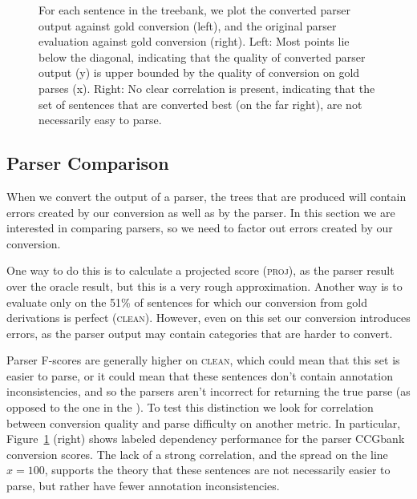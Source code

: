 \begin{figure}
	\vspace{-0.3cm}
	\hspace{-1.4cm}
	\scalebox{0.8}{
	
	\hspace{-2.9cm}
	
	}
	\vspace{-0.8cm}
	\caption{
		\label{fig:scatter_plots}
		For each sentence in the treebank, we plot the converted parser output
		against gold conversion (left), and the original parser evaluation against
		gold conversion (right).
		Left: Most points lie below the diagonal, indicating that the quality of
		converted parser output (y) is upper bounded by the quality of conversion on
		gold parses (x).
		Right: No clear correlation is present, indicating that the set of
		sentences that are converted best (on the far right), are not necessarily
		easy to parse.
	\vspace{-4.5mm}
	}
\end{figure}

\subsection{Parser Comparison}

When we convert the output of a \ccg parser, the \ptb trees that are produced
will contain errors created by our conversion as well as by the parser. In this
section we are interested in comparing parsers, so we need to factor out errors
created by our conversion.

One way to do this is to calculate a projected score (\textsc{proj}), as the
parser result over the oracle result, but this is a very rough approximation.
Another way is to evaluate only on the 51\% of sentences for which our
conversion from gold \ccg derivations is perfect (\textsc{clean}).  However,
even on this set our conversion introduces errors, as the parser output may
contain categories that are harder to convert.

Parser F-scores are generally higher on \textsc{clean}, which could mean that this
set is easier to parse, or it could mean that these sentences don't contain
annotation inconsistencies, and so the parsers aren't incorrect for returning
the true parse (as opposed to the one in the \ptb).  To test this distinction
we look for correlation between conversion quality and parse difficulty on
another metric.  In particular, Figure~\ref{fig:scatter_plots} (right) shows
\ccg labeled dependency performance for the \candc parser \myvs CCGbank
conversion \parseval scores. The lack of a strong correlation, and the spread
on the line $x=100$, supports the theory that these sentences are not
necessarily easier to parse, but rather have fewer annotation inconsistencies.

